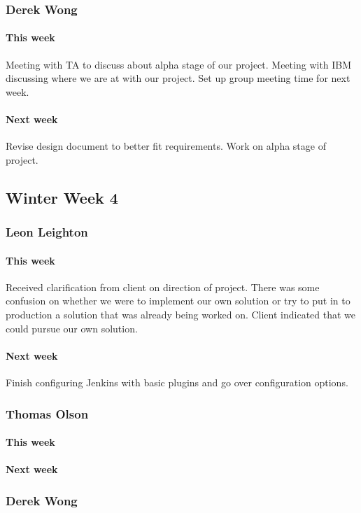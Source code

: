 \documentclass[10pt,letterpaper,onecolumn,draftclsnofoot]{IEEEtran}
\begin{document}
\subsubsection{Derek Wong}
\paragraph{This week}Meeting with TA to discuss about alpha stage of our project.  
Meeting with IBM discussing where we are at with our project.   
Set up group meeting time for next week.
\paragraph{Next week}Revise design document to better fit requirements.   
Work on alpha stage of project.


\subsection{Winter Week 4}
\subsubsection{Leon Leighton}
\paragraph{This week}Received clarification from client on direction of project. There was some confusion on whether we were to implement our own solution or try to put in to production a solution that was already being worked on. Client indicated that we could pursue our own solution.
\paragraph{Next week}Finish configuring Jenkins with basic plugins and go over configuration options.


\subsubsection{Thomas Olson}
\paragraph{This week}
\paragraph{Next week}


\subsubsection{Derek Wong}
\end{document}
